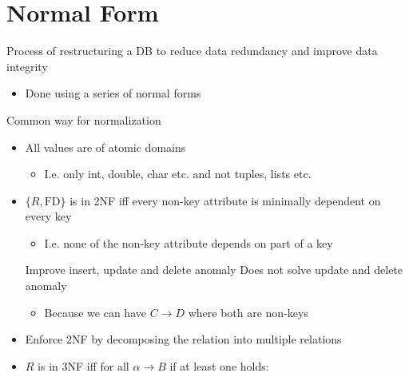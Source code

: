 
\section{Normal Form}
\begin{itemize}
     Process of restructuring a DB to reduce data redundancy and improve data integrity
        \begin{itemize}
            \item Done using a series of normal forms
        \end{itemize}
     Common way for normalization
        \begin{itemize}
            \item All values are of atomic domains
                \begin{itemize}
                    \item I.e. only int, double, char etc. and not tuples, lists etc.
                \end{itemize}
        \end{itemize}
        \begin{itemize}
            \item $\{R, \text{FD}\}$ is in 2NF iff every non-key attribute is minimally dependent on every key
                \begin{itemize}
                     No attribute depends on part of a key
                    \item I.e. none of the non-key attribute depends on part of a key
                \end{itemize}
            \ipro Improve insert, update and delete anomaly
            \icon Does not solve update and delete anomaly
                \begin{itemize}
                    \item Because we can have $C \to D$ where both are non-keys
                \end{itemize}
            \item Enforce 2NF by decomposing the relation into multiple relations
        \end{itemize}
        \begin{itemize}
            \item $R$ is in 3NF iff for all $\alpha \to B$ if at least one holds:
                \begin{itemize}

\end{itemize}
\end{itemize}
\end{itemize}
